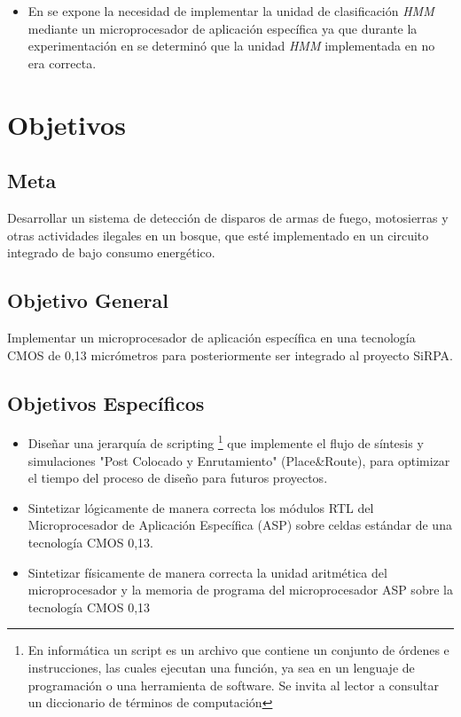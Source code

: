 \begin{itemize}
\item {En \cite{Carlosthesis} se expone la necesidad de implementar la unidad de clasificación \textit{HMM} mediante un microprocesador de aplicación específica ya que durante la experimentación en \cite{mio} se determinó que la unidad \textit{HMM} implementada en \cite{Lalfaro} no era correcta.}

\end{itemize}

\section{Objetivos}

\subsection{Meta}

Desarrollar un sistema de detección de disparos de armas de fuego, motosierras y otras actividades ilegales en un bosque, que esté implementado en un circuito integrado de bajo consumo energético.

\subsection{Objetivo General}

Implementar un microprocesador de aplicación específica en una tecnología CMOS de 0,13 micrómetros para posteriormente ser integrado al proyecto SiRPA.


\subsection{Objetivos Específicos}

\begin{itemize}

\item{Diseñar una jerarquía de scripting \footnote{En informática un script es un archivo que contiene un conjunto de órdenes e instrucciones, las cuales ejecutan una función, ya sea en un lenguaje de programación o una herramienta de software. Se invita al lector a consultar un diccionario de términos de computación} que implemente el flujo de síntesis y simulaciones {"Post Colocado y Enrutamiento"} (Place\&Route), para optimizar el tiempo del proceso de diseño para futuros proyectos.}

\item {Sintetizar lógicamente de manera correcta los módulos RTL del Microprocesador de Aplicación Específica (ASP) sobre celdas estándar de una tecnología CMOS 0,13.}

\item {Sintetizar físicamente de manera correcta la unidad aritmética del microprocesador y la memoria de programa del microprocesador ASP sobre la tecnología CMOS 0,13}

\end{itemize}

